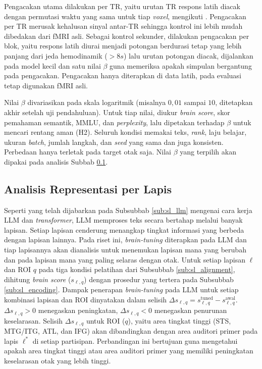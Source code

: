 Pengacakan utama dilakukan per TR, yaitu urutan TR respons latih diacak dengan permutasi waktu yang sama untuk tiap \textit{voxel}, mengikuti \textcite{negi2025brain}. Pengacakan per TR merusak kehalusan sinyal antar-TR sehingga kontrol ini lebih mudah dibedakan dari fMRI asli. Sebagai kontrol sekunder, dilakukan pengacakan per blok, yaitu respons latih diurai menjadi potongan berdurasi tetap yang lebih panjang dari jeda hemodinamik ($>8s$) lalu urutan potongan diacak, dijalankan pada model kecil dan satu nilai $\beta$ guna memeriksa apakah simpulan bergantung pada pengacakan. Pengacakan hanya diterapkan di data latih, pada evaluasi tetap digunakan fMRI asli.%

Nilai $\beta$ divariasikan pada skala logaritmik (misalnya $0{,}01$ sampai $10$, ditetapkan akhir setelah uji pendahuluan). Untuk tiap nilai, diukur \textit{brain score}, skor pemahaman semantik, MMLU, dan \textit{perplexity}, lalu dipetakan terhadap $\beta$ untuk mencari rentang aman (H2). Seluruh kondisi memakai teks, \textit{rank}, laju belajar, ukuran \textit{batch}, jumlah langkah, dan \textit{seed} yang sama dan juga konsisten. Perbedaan hanya terletak pada target otak saja. Nilai $\beta$ yang terpilih akan dipakai pada analisis Subbab \ref{sub:sl_lapis}.


\subsection{Analisis Representasi per Lapis}
\label{sub:sl_lapis}
 
Seperti yang telah dijabarkan pada Subsubbab \ref{sub:sl_llm} mengenai cara kerja LLM dan \textit{transformer}, LLM memproses teks secara bertahap melalui banyak lapisan. Setiap lapisan cenderung menangkap tingkat informasi yang berbeda dengan lapisan lainnya. Pada riset ini, \textit{brain-tuning} diterapkan pada LLM dan tiap lapisannya akan dianalisis untuk menemukan lapisan mana yang berubah dan pada lapisan mana yang paling selaras dengan otak. Untuk setiap lapisan $\ell$ dan ROI $q$ pada tiga kondisi pelatihan dari Subsubbab \ref{sub:sl_alignment}, dihitung \textit{brain score} ($s_{\ell,q}$) dengan prosedur yang tertera pada Subsubbab \ref{sub:sl_encoding}. Dampak penerapan \textit{brain-tuning} pada LLM untuk setiap kombinasi lapisan dan ROI dinyatakan dalam selisih $\Delta s_{\ell,q} = s^{\text{tuned}}_{\ell,q} - s^{\text{awal}}_{\ell,q}$. $\Delta s_{\ell,q} > 0$ menegaskan peningkatan, $\Delta s_{\ell,q} < 0$ menegaskan penurunan keselarasan. Selisih $\Delta s_{\ell,q}$ untuk ROI ($q$), yaitu area tingkat tinggi (STS, MTG/ITG, ATL, dan IFG) akan dibandingkan dengan area auditori primer pada lapis $\ell^*$ di setiap partisipan. Perbandingan ini bertujuan guna mengetahui apakah area tingkat tinggi atau area auditori primer yang memiliki peningkatan keselarasan otak yang lebih tinggi. 
 
